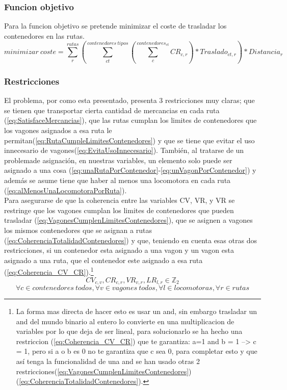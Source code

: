 \documentclass[11pt,spanish]{article}
\begin{document}
			\subsubsection{Funcion objetivo}
			Para la funcion objetivo se pretende minimizar el coste de trasladar los contenedores en las rutas.
			$$
			minimizar\ coste = \sum_r^{rutas} \left( \sum_{ct}^{contenedores\ tipos} \left( \sum_c^{contenedores_{ct}} CR_{c,r} \right) * Traslado_{ct,r} \right) * Distancia_r
			$$
			\subsubsection{Restricciones}
			El problema, por como esta presentado, presenta 3 restricciones muy claras; que se tienen que transportar cierta cantidad de mercancias en cada ruta (\ref{eq:SatisfaceMercancias}), que las rutas cumplan los limites de contenedores que los vagones asignados a esa ruta le permitan(\ref{eq:RutaCumpleLimitesContenedores}) y que se tiene que evitar el uso innecesario de vagones(\ref{eq:EvitaUsoInnecesario}). También, al tratarse de un problemade asignación, en nuestras variables, un elemento solo puede ser asignado a una cosa (\ref{eq:unaRutaPorContenedor}-\ref{eq:unVagonPorContenedor}) y además se asume tiene que haber al menos una locomotora en cada ruta (\ref{eq:alMenosUnaLocomotoraPorRuta}).\\
			Para asegurarse de que la coherencia entre las variables CV, VR, y VR se restringe que los vagones cumplan los limites de contenedores que pueden trasladar (\ref{eq:VagonesCumplenLimitesContenedores}), que se asignen a vagones los mismos contenedores que se asignan a rutas (\ref{eq:CoherenciaTotalidadContenedores}) y que, teniendo en cuenta esas otras dos restricciones, si un contenedor esta asignado a una vagon y un vagon esta asignado a una ruta, que el contenedor este asignado a esa ruta (\ref{eq:Coherencia_CV_CR}).\footnote{La forma mas directa de hacer esto es usar un and, sin embargo trasladar un and del mundo binario al entero lo convierte en una multiplicacion de variables por lo que deja de ser lineal, para solucionarlo se ha hecho una restriccion (\ref{eq:Coherencia_CV_CR}) que te garantiza: a=1 and b = 1 --> c = 1, pero si a o b es 0 no te garantiza que c sea 0, para completar esto y que así tenga la funcionalidad de una and se han usado otras 2 restricciones(\ref{eq:VagonesCumplenLimitesContenedores})(\ref{eq:CoherenciaTotalidadContenedores}).}
			$$
				CV_{c,v},CR_{c,r},VR_{v,r},LR_{l,r} \in \mathbb{Z}_2
			$$
			\begin{equation}
				\forall c \in contenedores\ todos, \forall v \in vagones\ todos, \forall l \in locomotoras, \forall r \in rutas	
			\end{equation}
\end{document}
